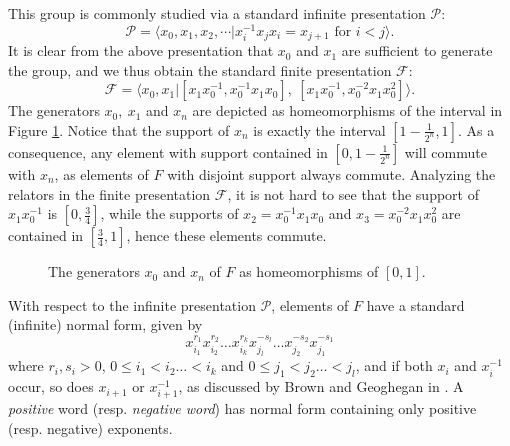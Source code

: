 \documentclass[11pt]{amsart}
\begin{document}
This group is commonly studied via a standard infinite presentation ${\mathcal P}$:
$${\mathcal P} = \langle x_0,x_1,x_2, \cdots  | x_i^{-1} x_j x_i = x_{j+1} \text{ for } i < j \rangle.$$
It is clear from the above presentation that $x_0$ and $x_1$ are sufficient to generate the group, and we thus obtain the standard finite presentation ${\mathcal F}$:
$${\mathcal F} = \langle x_0,x_1 | [x_1x_0^{-1},x_0^{-1}x_1x_0], \ [x_1x_0^{-1},x_0^{-2}x_1x_0^2] \rangle.$$
The generators $x_0, \ x_1$ and $x_n$ are depicted as homeomorphisms of the interval in Figure \ref{fig:generators}. Notice that the support of $x_n$ is exactly the interval $[1-\frac{1}{2^n},1]$.  As a consequence, any element with support contained in $[0, 1-\frac{1}{2^n}]$ will commute with $x_n$, as elements of $F$ with disjoint support always commute.  Analyzing the relators in the finite presentation ${\mathcal F}$, it is not hard to see that the support of $x_1x_0^{-1}$ is $[0, \frac{3}{4}]$, while the supports of $x_2 = x_0^{-1}x_1x_0$ and $x_3 = x_0^{-2}x_1x_0^2$ are contained in $[\frac{3}{4},1]$, hence these elements commute.

\begin{figure}[h!]
\begin{center}
\caption{The generators $x_0$ and $x_n$ of $F$ as homeomorphisms of $[0,1]$.} \label{fig:generators}
\end{center}
\end{figure}

With respect to the infinite presentation ${\mathcal P}$, elements of $F$ have a standard (infinite) normal form, given by $$x_{i_1}^{r_1}
x_{i_2}^{r_2}\ldots x_{i_k}^{r_k} x_{j_l}^{-s_l} \ldots
x_{j_2}^{-s_2} x_{j_1}^{-s_1} $$ where $r_i, s_i >0$, $0 \leq i_1<i_2
\ldots < i_k$ and $0 \leq j_1<j_2 \ldots < j_l$, and if
both $x_i$ and $x_i^{-1}$ occur, so does $x_{i+1}$ or  $x_{i+1}^{-1}$, as discussed by
Brown and Geoghegan in \cite{BG}.   A {\em positive} word (resp. {\em negative word}) has normal form containing only positive (resp. negative) exponents.
\end{document}
